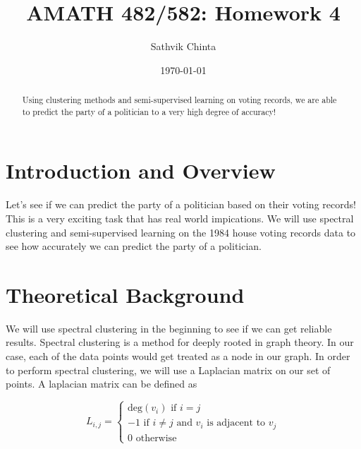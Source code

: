 \documentclass[11pt]{amsart}
\title{AMATH 482/582: Homework 4}
\author{Sathvik Chinta} %
\date{\today} %
\begin{document}
\maketitle 

\begin{abstract}
    Using clustering methods and semi-supervised learning on voting records, we are able to predict the party 
    of a politician to a very high degree of accuracy! 
\end{abstract}


\section{Introduction and Overview}\label{sec:Introduction}
Let's see if we can predict the party of a politician based on their
voting records! This is a very exciting task that has real world impications. We will use 
spectral clustering and semi-supervised learning on the 1984 house voting records data to see 
how accurately we can predict the party of a politician.    


\section{Theoretical Background}\label{sec:theory}

We will use spectral clustering in the beginning to see 
if we can get reliable results. Spectral clustering is a
method for deeply rooted in graph theory. In our case, each of the 
data points would get treated as a node in our graph. In order to perform spectral clustering, 
we will use a Laplacian matrix on our set of points. A laplacian matrix can be defined as 

\begin{equation*}
    L_{i,j} = 
    \begin{cases}
      \text{deg}(v_i) \text{ if } i = j\\      
      -1 \text{ if } i \neq j \text{ and } v_i \text{ is adjacent to } v_j\\
      0 \text{ otherwise }
    \end{cases}
\end{equation*}
\end{document}
